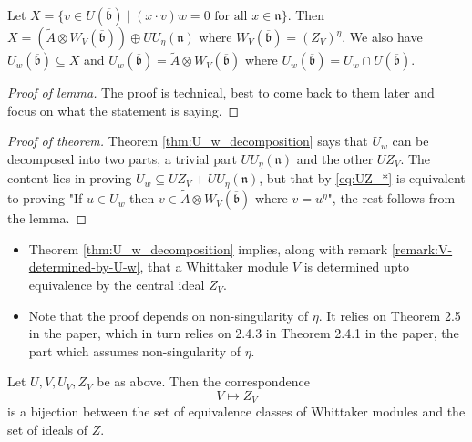 \documentclass{article}
\theoremstyle{mytheoremstyle}
\theoremstyle{mytheoremstyle}
\theoremstyle{myproblemstyle}
\begin{document}
    \begin{lemma}
      Let $X = \{v \in U(\overline{\mathfrak b}) \mid (x \cdot v)w = 0 \text{ for all } x \in \mathfrak n\}$. Then 
      $X = (\tilde A \otimes W_V(\overline{\mathfrak b})) \oplus UU_\eta(\mathfrak n)$ where $W_V(\overline{\mathfrak b}) = (Z_V)^\eta$.
      We also have $U_w(\overline{\mathfrak b}) \subseteq X$ and $U_w(\overline{\mathfrak b}) = \tilde A \otimes W_V(\overline{\mathfrak b})$ 
      where $U_w(\overline{\mathfrak b}) = U_w \cap U(\overline{\mathfrak b})$.

    \end{lemma}

    \begin{proof}[Proof of lemma]
      The proof is technical, best to come back to them later and focus on what the statement is saying.
    \end{proof}

    \begin{proof}[Proof of theorem]
    	Theorem \ref{thm:U_w_decomposition} says that $U_w$ can be decomposed into two parts, a trivial 
	part $UU_\eta(\mathfrak n)$ and the other $UZ_V$. The content lies in proving 
	$U_w \subseteq UZ_V + UU_\eta(\mathfrak n)$, but that by \eqref{eq:UZ_*} is equivalent to proving 
	"If $u\in U_w$ then $v \in \tilde A \otimes W_V(\overline{\mathfrak b})$ where $v = u^\eta$", the rest 
	follows from the lemma.

    \end{proof}


  \begin{remark}
    \hspace{1cm}
    \begin{itemize}
      \item Theorem \ref{thm:U_w_decomposition} implies, along with remark \ref{remark:V-determined-by-U-w},
	  that a Whittaker module $V$ is determined upto equivalence by the central ideal $Z_V$.
      \item Note that the proof depends on non-singularity of $\eta$. It relies on Theorem 2.5 in the paper, 
	which in turn relies on 2.4.3 in Theorem 2.4.1 in the paper, the part which assumes non-singularity of $\eta$. 
    \end{itemize}
  \end{remark} 
    

    \begin{theorem}
      Let $U, V, U_V, Z_V$ be as above. Then the correspondence 
      \begin{equation}
      	V \mapsto Z_V
      	\label{eq:correspondence}
      \end{equation}
      is a bijection between the set of equivalence classes of Whittaker modules and the set of ideals of $Z$.
    \end{theorem}
    
\end{document}

